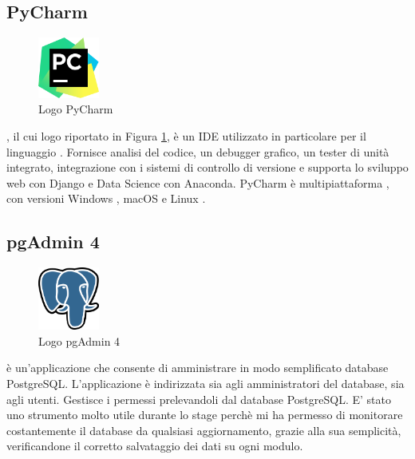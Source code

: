 \subsection{PyCharm}
\begin{figure}[H]
	\begin{center} \includegraphics[width=2cm]{figures/Logo_PyCharm}
		\caption[Logo PyCharm]{Logo PyCharm}
		\label{logo_pyc} 
	\end{center}
\end{figure}
, il cui logo riportato in Figura \ref{logo_pyc}, è un IDE utilizzato in particolare per il linguaggio . Fornisce analisi del codice, un debugger grafico, un tester di unità integrato, integrazione con i sistemi di controllo di versione e supporta lo sviluppo web con Django e Data Science con Anaconda. PyCharm è multipiattaforma , con versioni Windows , macOS e Linux .

\subsection{pgAdmin 4}
\begin{figure}[H]
	\begin{center} \includegraphics[width=2cm]{figures/Logo_Postgresql}
		\caption[Logo pgAdmin 4]{Logo pgAdmin 4}
		\label{logo_postgresql} 
	\end{center}
\end{figure}
 è un'applicazione che consente di amministrare in modo semplificato database PostgreSQL.  L'applicazione è indirizzata sia agli amministratori del database, sia agli utenti. Gestisce i permessi prelevandoli dal database PostgreSQL. E' stato uno strumento molto utile durante lo stage perchè mi ha permesso di monitorare costantemente il database da qualsiasi aggiornamento, grazie alla sua semplicità, verificandone il corretto salvataggio dei dati su ogni modulo.

